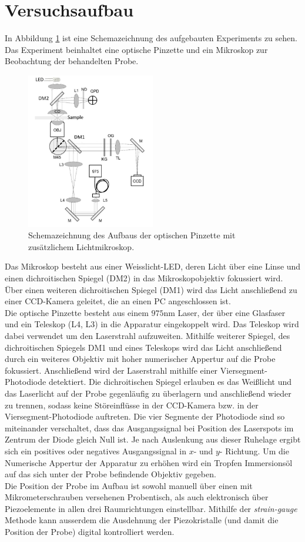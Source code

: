 \section{Versuchsaufbau}
In Abbildung \ref{fig:aufbau} ist eine Schemazeichnung des aufgebauten Experiments zu sehen. Das Experiment beinhaltet eine optische Pinzette und ein Mikroskop zur Beobachtung der behandelten Probe.
\begin{figure}[H]
  \centering
  \includegraphics[width=0.5\textwidth]{plots/aufbau.jpg}
  \caption{Schemazeichnung des Aufbaus der optischen Pinzette mit zusätzlichem Lichtmikroskop. \cite{anleitung}}
  \label{fig:aufbau}
\end{figure}
Das Mikroskop besteht aus einer Weisslicht-LED, deren Licht über eine Linse und einen dichroitischen Spiegel (DM2) in das Mikroskopobjektiv fokussiert wird. Über einen weiteren dichroitischen Spiegel (DM1) wird das Licht anschließend zu einer CCD-Kamera geleitet, die an einen PC angeschlossen ist.\\
Die optische Pinzette besteht aus einem $975 \si{\nano\meter}$ Laser, der über eine Glasfaser und ein Teleskop (L4, L3) in die Apparatur eingekoppelt wird. Das Teleskop wird dabei verwendet um den Laserstrahl aufzuweiten. Mithilfe weiterer Spiegel, des dichroitischen Spiegels DM1 und eines Teleskops wird das Licht anschließend durch ein weiteres Objektiv mit hoher numerischer Appertur auf die Probe fokussiert. Anschließend wird der Laserstrahl mithilfe einer Viersegment-Photodiode detektiert.
Die dichroitischen Spiegel erlauben es das Weißlicht und das Laserlicht auf der Probe gegenläufig zu überlagern und anschließend wieder zu trennen, sodass keine Störeinflüsse in der CCD-Kamera bzw. in der Viersegment-Photodiode auftreten. Die vier Segmente der Photodiode sind so miteinander verschaltet, dass das Ausgangssignal bei Position des Laserspots im Zentrum der Diode gleich Null ist. Je nach Auslenkung aus dieser Ruhelage ergibt sich ein positives oder negatives Ausgangssignal in $x$- und $y$- Richtung. Um die Numerische Appertur der Apparatur zu erhöhen wird ein Tropfen Immersionsöl auf das sich unter der Probe befindende Objektiv gegeben. \\
Die Position der Probe im Aufbau ist sowohl manuell über einen mit Mikrometerschrauben versehenen Probentisch, als auch elektronisch über Piezoelemente in allen drei Raumrichtungen einstellbar. Mithilfe der \textit{strain-gauge} Methode kann ausserdem die Ausdehnung der Piezokristalle (und damit die Position der Probe) digital kontrolliert werden.

